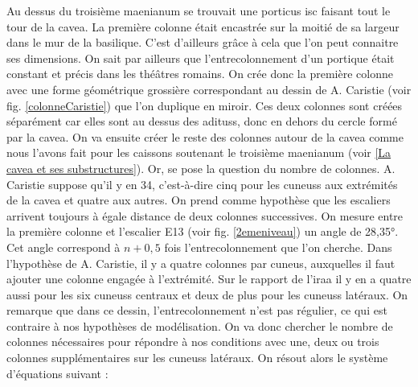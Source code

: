 Au dessus du troisième \gls{maenianum} se trouvait une \gls{porticus isc} faisant tout le tour de la \gls{cavea}. La première colonne était encastrée sur la moitié de sa largeur dans le mur de la basilique. C'est d'ailleurs grâce à cela que l'on peut connaitre ses dimensions. On sait par ailleurs que l'entrecolonnement d'un portique était constant et précis dans les théâtres romains. On crée donc la première colonne avec une forme géométrique grossière correspondant au dessin de A. Caristie (voir fig. \ref{colonneCaristie}) que l'on duplique en miroir. Ces deux colonnes sont créées séparément car elles sont au dessus des \glspl{aditus}, donc en dehors du cercle formé par la \gls{cavea}. On va ensuite créer le reste des colonnes autour de la \gls{cavea} comme nous l'avons fait pour les caissons soutenant le troisième \gls{maenianum} (voir \ref{La cavea et ses substructures}). Or, se pose la question du nombre de colonnes. A. Caristie suppose qu'il y en 34, c'est-à-dire cinq pour les \glspl{cuneus} aux extrémités de la \gls{cavea} et quatre aux autres. On prend comme hypothèse que les escaliers arrivent toujours à égale distance de deux colonnes successives. On mesure entre la première colonne et l'escalier E13 (voir fig. \ref{2emeniveau}) un angle de 28,35°. Cet angle correspond à $n+0,5$ fois l'entrecolonnement que l'on cherche. Dans l'hypothèse de A. Caristie, il y a quatre colonnes par \gls{cuneus}, auxquelles il faut ajouter une colonne engagée à l'extrémité. Sur le rapport de l'\gls{iraa} \cite[Pl. XX]{orangePl} il y en a quatre aussi pour les six \glspl{cuneus} centraux et deux de plus pour les \glspl{cuneus} latéraux. On remarque que dans ce dessin, l'entrecolonnement n'est pas régulier, ce qui est contraire à nos hypothèses de modélisation. On va donc chercher le nombre de colonnes nécessaires pour répondre à nos conditions avec une, deux ou trois colonnes supplémentaires sur les \glspl{cuneus} latéraux. On résout alors le système d'équations suivant :


